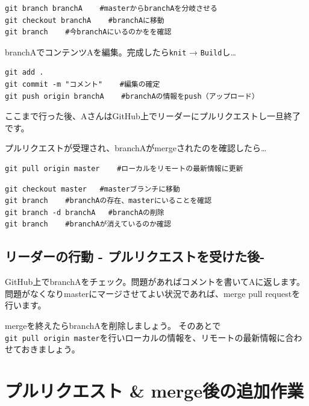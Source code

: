 \documentclass[
]{book}
\begin{document}
\begin{verbatim}
git branch branchA    #masterからbranchAを分岐させる
git checkout branchA    #branchAに移動
git branch    #今branchAにいるのかをを確認
\end{verbatim}

branchAでコンテンツAを編集。完成したら\texttt{knit} → \texttt{Build}し\ldots{}

\begin{verbatim}
git add . 
git commit -m "コメント"    #編集の確定
git push origin branchA    #branchAの情報をpush（アップロード）
\end{verbatim}

ここまで行った後、AさんはGitHub上でリーダーにプルリクエストし一旦終了です。

プルリクエストが受理され、branchAがmergeされたのを確認したら\ldots{}

\begin{verbatim}
git pull origin master    #ローカルをリモートの最新情報に更新
\end{verbatim}

\begin{verbatim}
git checkout master   #masterブランチに移動
git branch    #branchAの存在、masterにいることを確認
git branch -d branchA   #branchAの削除
git branch    #branchAが消えているのか確認
\end{verbatim}

\hypertarget{ux30eaux30fcux30c0ux30fcux306eux884cux52d5---ux30d7ux30ebux30eaux30afux30a8ux30b9ux30c8ux3092ux53d7ux3051ux305fux5f8c-}{%
\subsection{リーダーの行動 - プルリクエストを受けた後-}\label{ux30eaux30fcux30c0ux30fcux306eux884cux52d5---ux30d7ux30ebux30eaux30afux30a8ux30b9ux30c8ux3092ux53d7ux3051ux305fux5f8c-}}

GitHub上でbranchAをチェック。問題があればコメントを書いてAに返します。問題がなくなりmasterにマージさせてよい状況であれば、merge pull requestを行います。

mergeを終えたらbranchAを削除しましょう。
そのあとで\texttt{git\ pull\ origin\ master}を行いローカルの情報を、リモートの最新情報に合わせておきましょう。

\hypertarget{ux30d7ux30ebux30eaux30afux30a8ux30b9ux30c8-mergeux5f8cux306eux8ffdux52a0ux4f5cux696d}{%
\section{プルリクエスト \& merge後の追加作業}\label{ux30d7ux30ebux30eaux30afux30a8ux30b9ux30c8-mergeux5f8cux306eux8ffdux52a0ux4f5cux696d}}
\end{document}
